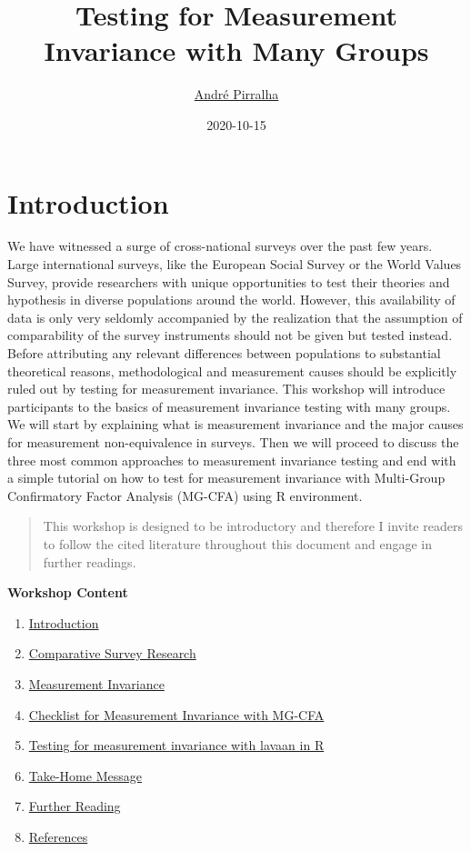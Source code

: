 \documentclass[
]{book}
\title{Testing for Measurement Invariance with Many Groups}
\author{\href{https://www.andrepirralha.com}{André Pirralha}}
\date{2020-10-15}
\providecommand{\tightlist}{%
  \setlength{\itemsep}{0pt}\setlength{\parskip}{0pt}}
\begin{document}
\maketitle

{
\setcounter{tocdepth}{1}
\tableofcontents
}
\hypertarget{intro}{%
\chapter{Introduction}\label{intro}}

We have witnessed a surge of cross-national surveys over the past few years. Large international surveys, like the European Social Survey or the World Values Survey, provide researchers with unique opportunities to test their theories and hypothesis in diverse populations around the world. However, this availability of data is only very seldomly accompanied by the realization that the assumption of comparability of the survey instruments should not be given but tested instead. Before attributing any relevant differences between populations to substantial theoretical reasons, methodological and measurement causes should be explicitly ruled out by testing for measurement invariance. This workshop will introduce participants to the basics of measurement invariance testing with many groups. We will start by explaining what is measurement invariance and the major causes for measurement non-equivalence in surveys. Then we will proceed to discuss the three most common approaches to measurement invariance testing and end with a simple tutorial on how to test for measurement invariance with Multi-Group Confirmatory Factor Analysis (MG-CFA) using R environment.

\begin{quote}
This workshop is designed to be introductory and therefore I invite readers to follow the cited literature throughout this document and engage in further readings.
\end{quote}

\textbf{Workshop Content}

\begin{enumerate}
\def\labelenumi{\arabic{enumi}.}
\tightlist
\item
  \protect\hyperlink{intro}{Introduction}\\
\item
  \protect\hyperlink{comp}{Comparative Survey Research}
\item
  \protect\hyperlink{invariance}{Measurement Invariance}
\item
  \protect\hyperlink{check}{Checklist for Measurement Invariance with MG-CFA}
\item
  \protect\hyperlink{lavaan}{Testing for measurement invariance with lavaan in R}
\item
  \protect\hyperlink{home}{Take-Home Message}
\item
  \protect\hyperlink{further}{Further Reading}
\item
  \protect\hyperlink{ref}{References}
\end{enumerate}
\end{document}
